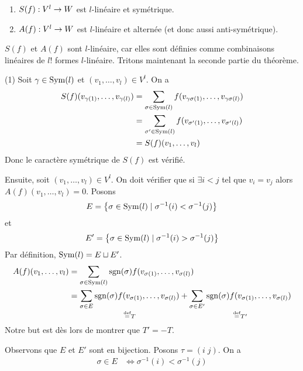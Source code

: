 \begin{theoreme}
  \begin{enumerate}
    \item $S(f): V^l \rightarrow W$ est $l$-linéaire et symétrique.
    \item $A(f): V^l \rightarrow W$ est $l$-linéaire et alternée (et donc aussi anti-symétrique).
  \end{enumerate}

  \tcblower
  \begin{preuve}
    $S(f)$ et $A(f)$ sont $l$-linéaire, car elles sont définies comme combinaisons linéaires de $l!$ formes $l$-linéaire. Tritons maintenant la seconde partie du théorème.
    \par (1) Soit $\gamma \in \operatorname{Sym}(l)$ et $(v_1, \dots, v_l) \in V^l$. On a
    \begin{align*}
      S(f)(v_{\gamma(1)}, \dots, v_{\gamma(l)}) &= \sum_{\sigma \in \operatorname{Sym}(l)} f(v_{\gamma\sigma(1)}, \dots, v_{\gamma\sigma(l)}) \\
                                                &= \sum_{\sigma' \in \operatorname{Sym}(l)} f(v_{\sigma'(1)}, \dots, v_{\sigma'(l)}) \\
                                                &= S(f)(v_1, \dots, v_l)
    \end{align*}
    Donc le caractère symétrique de $S(f)$ est vérifié.
    \par Ensuite, soit $(v_1, \dots, v_l) \in V^l$. On doit vérifier que si $\exists i < j$ tel que $v_i = v_j$ alors $A(f)(v_1, \dots, v_l) = 0$. Posons 
    $$E = \left\{ \sigma \in \operatorname{Sym}(l) \mid \sigma^{-1}(i) < \sigma^{-1}(j) \right\}$$
    et
    $$E' = \left\{ \sigma \in \operatorname{Sym}(l) \mid \sigma^{-1}(i) > \sigma^{-1}(j) \right\}$$
    Par définition, $\operatorname{Sym}(l) = E \sqcup E'$.
    \begin{align*}
      A(f)(v_1, \dots, v_l) &= \sum_{\sigma \in \operatorname{Sym}(l)} \operatorname{sgn}(\sigma)f(v_{\sigma(1)}, \dots, v_{\sigma(l)}) \\
                            &= \underset{\stackrel{\text{def}}{=} T}{\sum_{\sigma \in E} \operatorname{sgn}(\sigma)f(v_{\sigma(1)}, \dots, v_{\sigma(l)})} + \underset{\stackrel{\text{def}}{=} T'}{\sum_{\sigma \in E'} \operatorname{sgn}(\sigma)f(v_{\sigma(1)}, \dots, v_{\sigma(l)})}
    \end{align*}
    Notre but est dès lors de montrer que $T' = -T$.
    \par Observons que $E$ et $E'$ sont en bijection. Posons $\tau = (i \; j)$. On a
     \begin{align*}
       \sigma \in E &\iff \sigma^{-1}(i) < \sigma^{-1}(j) \\

\end{align*}
\end{preuve}
\end{theoreme}
